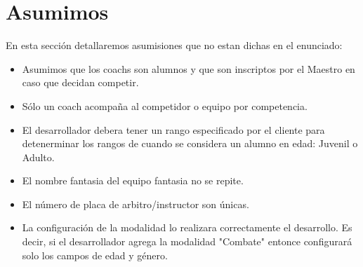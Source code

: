 \section{Asumimos}

En esta secci\'on detallaremos asumisiones que no estan dichas en el enunciado:

\begin{itemize}

\item Asumimos que los coachs son alumnos y que son inscriptos por el Maestro en caso que decidan competir.
\item S\'olo un coach acompaña al competidor o equipo por competencia.
\item El desarrollador debera tener un rango especificado por el cliente para detenerminar los rangos de cuando se considera un alumno en edad: Juvenil o Adulto.
\item El nombre fantasia del equipo fantasia no se repite.
\item El n\'umero de placa de arbitro/instructor son \'unicas.
\item La configuraci\'on de la modalidad lo realizara correctamente el desarrollo. Es decir, si el desarrollador agrega la modalidad "Combate" entonce configurar\'a solo los campos de edad y g\'enero. 



\end{itemize}


